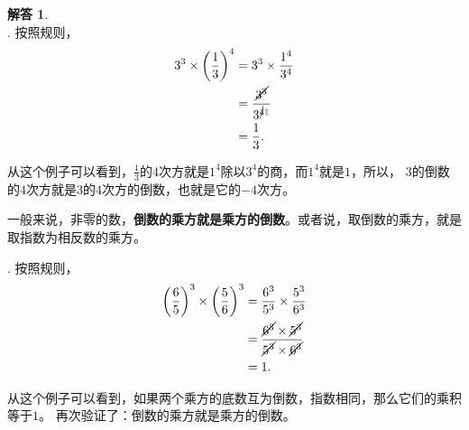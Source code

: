 \documentclass[12pt,UTF8]{ctexbook}
\theoremstyle{definition}
\newtheorem*{so}{解答}
\theoremstyle{plain}
\begin{document}
\begin{so}
    \mbox{} \\
    . 按照规则，
    \begin{align*}
        3^3 \times \left(\frac{1}{3}\right)^4 &= 3^3\times \frac{1^4}{3^4} \\
        &= \frac{\cancel{3^3}}{3^{\cancel{4}{\color{red} 1}}} \\
        &= \frac{1}{3}.
    \end{align*}
    
    从这个例子可以看到，$\frac{1}{3}$的$4$次方就是$1^4$除以$3^4$的商，而$1^4$就是$1$，所以，
    $3$的倒数的$4$次方就是$3$的$4$次方的倒数，也就是它的$-4$次方。

    一般来说，非零的数，\textbf{倒数的乘方就是乘方的倒数}。或者说，取倒数的乘方，就是取指数为相反数的乘方。

    . 按照规则，
    \begin{align*}
        \left(\frac{6}{5}\right)^3\times \left(\frac{5}{6}\right)^3 &= \frac{6^3}{5^3}\times \frac{5^3}{6^3} \\
        &= \frac{\cancel{6^3}\times \cancel{5^3}}{\cancel{5^3}\times \cancel{6^3}} \\
        &= 1.
    \end{align*}

    从这个例子可以看到，如果两个乘方的底数互为倒数，指数相同，那么它们的乘积等于$1$。
    再次验证了：倒数的乘方就是乘方的倒数。
    

\end{so}
\end{document}
